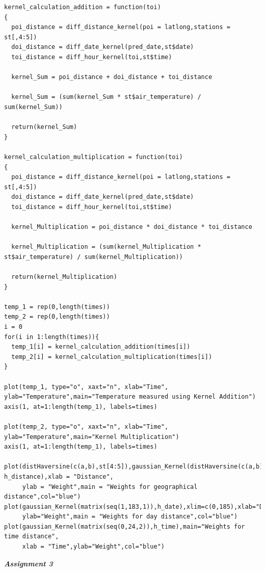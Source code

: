 \documentclass[a4paper,10pt]{article}
\begin{document}
\begin{lstlisting}
kernel_calculation_addition = function(toi)
{
  poi_distance = diff_distance_kernel(poi = latlong,stations = st[,4:5])
  doi_distance = diff_date_kernel(pred_date,st$date)
  toi_distance = diff_hour_kernel(toi,st$time)
  
  kernel_Sum = poi_distance + doi_distance + toi_distance
  
  kernel_Sum = (sum(kernel_Sum * st$air_temperature) / sum(kernel_Sum))
 
  return(kernel_Sum)
}

kernel_calculation_multiplication = function(toi)
{
  poi_distance = diff_distance_kernel(poi = latlong,stations = st[,4:5])
  doi_distance = diff_date_kernel(pred_date,st$date)
  toi_distance = diff_hour_kernel(toi,st$time)
  
  kernel_Multiplication = poi_distance * doi_distance * toi_distance
  
  kernel_Multiplication = (sum(kernel_Multiplication * st$air_temperature) / sum(kernel_Multiplication))

  return(kernel_Multiplication)
}

temp_1 = rep(0,length(times))
temp_2 = rep(0,length(times))
i = 0
for(i in 1:length(times)){
  temp_1[i] = kernel_calculation_addition(times[i])
  temp_2[i] = kernel_calculation_multiplication(times[i])
}

plot(temp_1, type="o", xaxt="n", xlab="Time", ylab="Temperature",main="Temperature measured using Kernel Addition")
axis(1, at=1:length(temp_1), labels=times)

plot(temp_2, type="o", xaxt="n", xlab="Time", ylab="Temperature",main="Kernel Multiplication")
axis(1, at=1:length(temp_1), labels=times)

plot(distHaversine(c(a,b),st[4:5]),gaussian_Kernel(distHaversine(c(a,b),st[4:5]),
h_distance),xlab = "Distance",
     ylab = "Weight",main = "Weights for geographical distance",col="blue")
plot(gaussian_Kernel(matrix(seq(1,183,1)),h_date),xlim=c(0,185),xlab="Days",
     ylab="Weight",main = "Weights for day distance",col="blue")
plot(gaussian_Kernel(matrix(seq(0,24,2)),h_time),main="Weights for time distance",
     xlab = "Time",ylab="Weight",col="blue")
\end{lstlisting} \par
\vspace{0.5cm}
\large \textit{\textbf{Assignment 3}} \par
\end{document}
